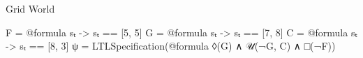 \begin{frame}[fragile,t]{Grid World}
\pause\pause\pause\pause\pause\pause\pause
\vspace{0.8\baselineskip}
\begin{small}
\begin{algorithmblock}
\begin{juliaverbatim}
F = @formula sₜ -> sₜ == [5, 5]
G = @formula sₜ -> sₜ == [7, 8]
C = @formula sₜ -> sₜ == [8, 3]
ψ = LTLSpecification(@formula ◊(G) ∧ 𝒰(¬G, C) ∧ □(¬F))
\end{juliaverbatim}
\end{algorithmblock}
\end{small}

\end{frame}